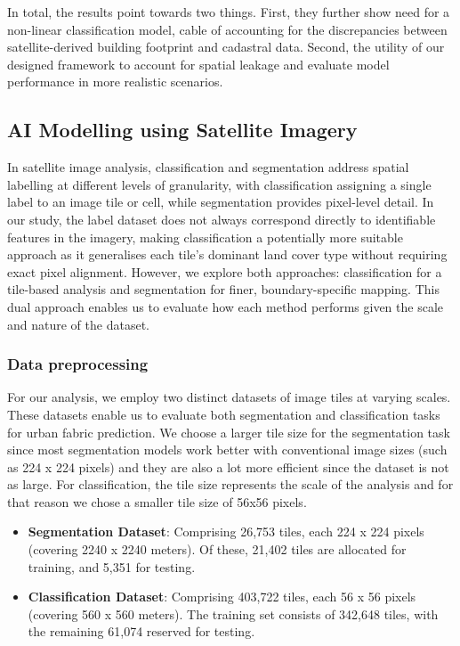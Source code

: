 \documentclass[
  letterpaper,
  DIV=11,
  numbers=noendperiod]{scrartcl}
\providecommand{\tightlist}{%
  \setlength{\itemsep}{0pt}\setlength{\parskip}{0pt}}\usepackage{longtable,booktabs,array}
\begin{document}
In total, the results point towards two things. First, they further show
need for a non-linear classification model, cable of accounting for the
discrepancies between satellite-derived building footprint and cadastral
data. Second, the utility of our designed framework to account for
spatial leakage and evaluate model performance in more realistic
scenarios.

\subsection{AI Modelling using Satellite
Imagery}\label{ai-modelling-using-satellite-imagery-1}

In satellite image analysis, classification and segmentation address
spatial labelling at different levels of granularity, with
classification assigning a single label to an image tile or cell, while
segmentation provides pixel-level detail. In our study, the label
dataset does not always correspond directly to identifiable features in
the imagery, making classification a potentially more suitable approach
as it generalises each tile's dominant land cover type without requiring
exact pixel alignment. However, we explore both approaches:
classification for a tile-based analysis and segmentation for finer,
boundary-specific mapping. This dual approach enables us to evaluate how
each method performs given the scale and nature of the dataset.

\subsubsection{Data preprocessing}\label{data-preprocessing-1}

For our analysis, we employ two distinct datasets of image tiles at
varying scales. These datasets enable us to evaluate both segmentation
and classification tasks for urban fabric prediction. We choose a larger
tile size for the segmentation task since most segmentation models work
better with conventional image sizes (such as 224 x 224 pixels) and they
are also a lot more efficient since the dataset is not as large. For
classification, the tile size represents the scale of the analysis and
for that reason we chose a smaller tile size of 56x56 pixels.

\begin{itemize}
\tightlist
\item
  \textbf{Segmentation Dataset}: Comprising 26,753 tiles, each 224 x 224
  pixels (covering 2240 x 2240 meters). Of these, 21,402 tiles are
  allocated for training, and 5,351 for testing.
\item
  \textbf{Classification Dataset}: Comprising 403,722 tiles, each 56 x
  56 pixels (covering 560 x 560 meters). The training set consists of
  342,648 tiles, with the remaining 61,074 reserved for testing.
\end{itemize}
\end{document}
